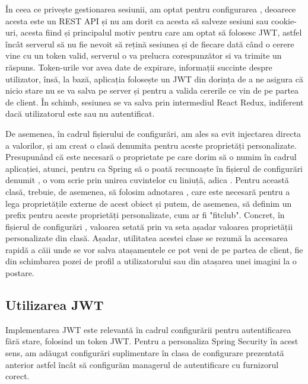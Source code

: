 În ceea ce privește gestionarea sesiunii, am optat pentru configurarea , deoarece acesta este un REST API și nu am dorit ca acesta să salveze sesiuni sau cookie-uri, acesta fiind și principalul motiv pentru care am optat să folosesc JWT, astfel încât serverul să nu fie nevoit să rețină sesiunea și de fiecare dată când o cerere vine cu un token valid, serverul o va prelucra corespunzător si va trimite un răspuns. Token-urile vor avea date de expirare, informații succinte despre utilizator, însă, la bază, aplicația folosește un JWT din dorința de a ne asigura că nicio stare nu se va salva pe server și pentru a valida cererile ce vin de pe partea de client. În schimb, sesiunea se va salva prin intermediul React Redux, indiferent dacă utilizatorul este sau nu autentificat.\newline

De asemenea, în cadrul fișierului de configurări, am ales sa evit injectarea directa a valorilor, și am creat o clasă denumita  pentru aceste proprietăți personalizate. Presupunând că este necesară o proprietate pe care dorim să o numim  în cadrul aplicației, atunci, pentru ca Spring să o poată recunoaște în fișierul de configurări denumit , o vom scrie prin unirea cuvintelor cu liniuță, adica .
Pentru această clasă, trebuie, de asemenea, să folosim adnotarea , care este necesară pentru a lega proprietățile externe de acest obiect și putem, de asemenea, să definim un prefix pentru aceste proprietăți personalizate, cum ar fi "fitclub". Concret, în fișierul de configurări , valoarea setată prin  va seta așadar valoarea proprietății personalizate din clasă.\newline 
Așadar, utilitatea acestei clase se rezumă la accesarea rapidă a căii unde se vor salva atașamentele ce pot veni de pe partea de client, fie din schimbarea pozei de profil a utilizatorului sau din atașarea unei imagini la o postare.\newline

\subsection{Utilizarea JWT}

Implementarea JWT este relevantă în cadrul configurării pentru autentificarea fără stare, folosind un token JWT. Pentru a personaliza Spring Security în acest sens, am adăugat configurări suplimentare în clasa de configurare prezentată anterior astfel încât să configurăm managerul de autentificare cu furnizorul corect.\newline


